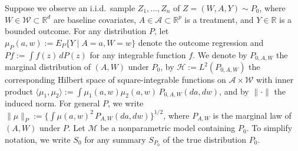 \documentclass[11pt]{article}
\theoremstyle{plain}
\begin{document}
Suppose we observe an i.i.d.\ sample $Z_1,\ldots,Z_n$ of
$Z=(W,A,Y)\sim P_0$, where $W\in\mathcal W\subset\mathbb R^d$ are baseline
covariates, $A\in\mathcal A\subset\mathbb R^p$ is a treatment, and $Y\in\mathbb R$
is a bounded outcome. For any distribution $P$, let
$\mu_P(a,w) := E_P\{Y \mid A=a, W=w\}$ denote the outcome regression and
$P f := \int f(z)\,dP(z)$ for any integrable function $f$. We denote by
$P_{0,A,W}$ the marginal distribution of $(A,W)$ under $P_0$, by
$\mathcal H := L^2(P_{0,A,W})$ the corresponding Hilbert space of
square-integrable functions on $\mathcal A \times \mathcal W$ with inner product
$\langle \mu_1,\mu_2\rangle := \int \mu_1(a,w)\mu_2(a,w)\,P_{0,A,W}(da,dw)$, and
by $\|\cdot\|$ the induced norm. For general $P$, we write
$\|\mu\|_P := \{\int \mu(a,w)^2\,P_{A,W}(da,dw)\}^{1/2}$, where $P_{A,W}$ is the
marginal law of $(A,W)$ under $P$. Let $\mathcal{M}$ be a nonparametric model containing $P_0$.
To simplify notation, we write \(S_0\) for any summary \(S_{P_0}\) of the true
distribution \(P_0\).




 



\end{document}

